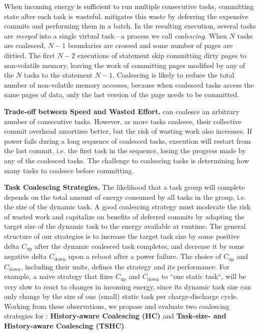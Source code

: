 When incoming energy is sufficient to run multiple consecutive tasks,
committing state after each task is wasteful. \sys mitigates this
waste by deferring the expensive commits and performing them in a
batch. In the resulting execution, several tasks are \emph{merged} into a
single virtual task---a process we call \emph{coalescing}. 
%
When $N$ tasks are coalesced, $N-1$ boundaries are crossed and some number of
pages are dirtied. The first $N-2$ executions of \transition statement skip
committing dirty pages to non-volatile memory, leaving the work of committing
pages modified by any of the $N$ tasks to the statement $N-1$.
Coalescing is likely to reduce the total number of non-volatile memory
accesses, because when coalesced tasks access the same pages of data, only the
last version of the page needs to be committed. 

\textbf{Trade-off between Speed and Wasted Effort.} \sys can coalesce an
arbitrary number of consecutive tasks. However, as more tasks coalesce, their
collective commit overhead amortizes better, but the risk of wasting work also
increases. If power fails during a long sequence of coalesced tasks, execution
will restart from the last commit, i.e. the first task in the sequence, losing
the progress made by any of the coalesced tasks.  The challenge to coalescing
tasks is determining how many tasks to coalesce before committing.
%

\textbf{Task Coalescing Strategies.} 
%
The likelihood that a task group will complete depends on the total amount of
energy consumed by all tasks in the group, i.e. the size of the dynamic task.
%
A good coalescing strategy must moderate the risk of wasted work and capitalize
on benefits of deferred commits by adapting the target size of the dynamic task
to the energy available at runtime.
%
The general structure of our strategies is to increase the target task size by
some positive delta $C_\text{up}$ after the dynamic coalesced task completes,
and decrease it by some negative delta $C_\text{down}$ upon a reboot after a
power failure.
%
The choice of $C_\text{up}$ and $C_\text{down}$, including their units, defines
the strategy and its performance.
%
For example, a naive strategy that fixes $C_\text{up}$ and $C_\text{down}$ to
``one static task``, will be very slow to react to changes in incoming energy,
since its dynamic task size can only change by the size of one (small) static
task per charge-discharge cycle.
%
Working from these observations, we propose and evaluate two coalescing
strategies for \sys: \textbf{History-aware Coalescing (HC)} and
\textbf{Task-size- and History-aware Coalescing (TSHC)}.

